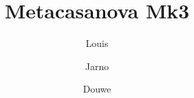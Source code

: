 \documentclass[xetex]{beamer}
\title{Metacasanova Mk3}
\author{Louis \and Jarno \and Douwe}
\begin{document}
    \frame{\titlepage}

    
    
    
\end{document}
